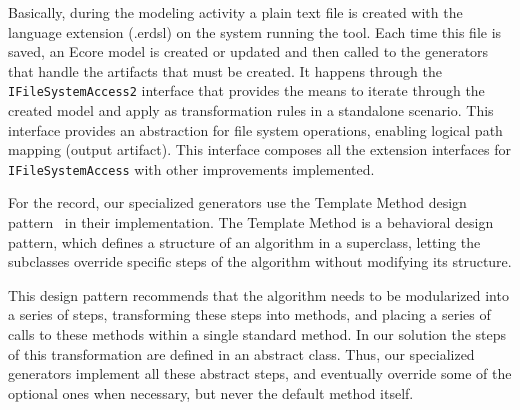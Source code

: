 Basically, during the modeling activity a plain text file is created with the language extension (.erdsl) on the system running the tool.
Each time this file is saved, an Ecore model is created or updated and then called to the generators that handle the artifacts that must be created.
It happens through the \texttt {IFileSystemAccess2} interface that provides the means to iterate through the created model and apply as transformation rules in a standalone scenario.
This interface provides an abstraction for file system operations, enabling logical path mapping (output artifact).
This interface composes all the extension interfaces for \texttt {IFileSystemAccess} with other improvements implemented.

For the record, our specialized generators use the Template Method design pattern~\cite{GOF:95} in their implementation.
The Template Method is a behavioral design pattern, which defines a structure of an algorithm in a superclass, letting the subclasses override specific steps of the algorithm without modifying its structure.

This design pattern recommends that the algorithm needs to be modularized into a series of steps, transforming these steps into methods, and placing a series of calls to these methods within a single standard method.
In our solution the steps of this transformation are defined in an abstract class.
Thus, our specialized generators implement all these abstract steps, and eventually override some of the optional ones when necessary, but never the default method itself.

